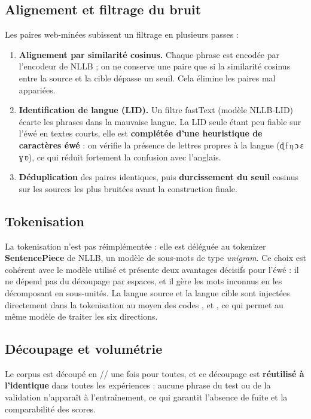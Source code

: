 \documentclass[11pt,a4paper]{article}
\begin{document}
\subsection{Alignement et filtrage du bruit}
Les paires web-minées subissent un filtrage en plusieurs passes :

\begin{enumerate}[leftmargin=1.5em,itemsep=3pt]
  \item \textbf{Alignement par similarité cosinus.} Chaque phrase est encodée par
        l'encodeur de NLLB ; on ne conserve une paire que si la similarité cosinus entre
        la source et la cible dépasse un seuil. Cela élimine les paires mal appariées.
  \item \textbf{Identification de langue (LID).} Un filtre fastText (modèle NLLB-LID)
        écarte les phrases dans la mauvaise langue. La LID seule étant peu fiable sur
        l'éwé en textes courts, elle est \textbf{complétée d'une heuristique de
        caractères éwé} : on vérifie la présence de lettres propres à la langue
        (\mbox{ɖ\,ƒ\,ŋ\,ɔ\,ɛ\,ɣ\,ʋ}), ce qui réduit fortement la confusion avec l'anglais.
  \item \textbf{Déduplication} des paires identiques, puis \textbf{durcissement du seuil}
        cosinus sur les sources les plus bruitées avant la construction finale.
\end{enumerate}

\subsection{Tokenisation}
La tokenisation n'est pas réimplémentée : elle est déléguée au tokenizer
\textbf{SentencePiece} de NLLB, un modèle de sous-mots de type \emph{unigram}. Ce choix
est cohérent avec le modèle utilisé et présente deux avantages décisifs pour l'éwé :
il ne dépend pas du découpage par espaces, et il gère les mots inconnus en les
décomposant en sous-unités. La langue source et la langue cible sont injectées
directement dans la tokenisation au moyen des codes ,  et
, ce qui permet au même modèle de traiter les six directions.

\subsection{Découpage et volumétrie}
Le corpus est découpé en // une fois pour toutes, et
ce découpage est \textbf{réutilisé à l'identique} dans toutes les expériences : aucune
phrase du test ou de la validation n'apparaît à l'entraînement, ce qui garantit
l'absence de fuite et la comparabilité des scores.
\end{document}
